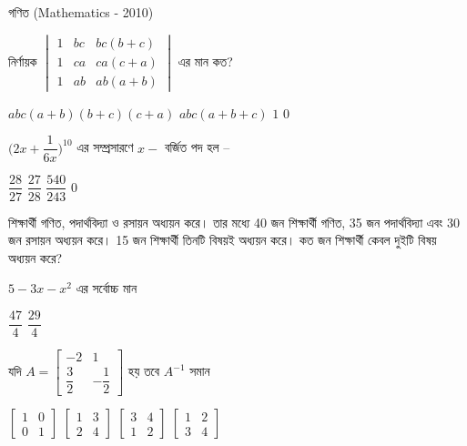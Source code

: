 \documentclass[addpoints]{exam}
\begin{document}
\begin{LARGE}
\begin{center}
গণিত (Mathematics - 2010)
\end{center}
\end{LARGE}
\begin{questions}

 \question নির্ণায়ক $ \begin{vmatrix}
 1 & bc & bc(b+c)\\
 1 & ca & ca(c+a)\\
 1 & ab & ab(a+b)
\end{vmatrix}   $  এর মান কত?

\begin{oneparchoices}
\choice $ abc(a+b)(b+c)(c+a) $
\choice $ abc(a+b+c) $
\choice $ 1 $
\choice $ 0 $
\end{oneparchoices}

\question $ \Bigg(2x + \dfrac{1}{6x} \Bigg)^{10} $ এর সম্প্রসারণে $ x- $ বর্জিত পদ হল – 

\begin{oneparchoices}
\choice $ \dfrac{28}{27} $
\choice $ \dfrac{27}{28} $
\choice $ \dfrac{540}{243} $
\choice  $ 0 $
\end{oneparchoices}

 শিক্ষার্থী গণিত, পদার্থবিদ্যা ও রসায়ন অধ্যয়ন করে। তার মধ্যে 40 জন শিক্ষার্থী গণিত, 35 জন পদার্থবিদ্যা এবং 30 জন রসায়ন অধ্যয়ন করে। 15 জন শিক্ষার্থী তিনটি বিষয়ই অধ্যয়ন করে। কত জন শিক্ষার্থী কেবল দুইটি বিষয় অধ্যয়ন করে?


\begin{oneparchoices}

\end{oneparchoices}

\question $ 5-3x-x^{2} $  এর সর্বোচ্চ মান

\begin{oneparchoices}
\choice $ \dfrac{47}{4} $
\choice $ \dfrac{29}{4} $
\end{oneparchoices}

\question  যদি $ A = \begin{bmatrix}
-2 & 1\\
\dfrac{3}{2} & -\dfrac{1}{2} 
\end{bmatrix} $ হয় তবে $ A^{-1} $ সমান

\begin{oneparchoices}
\choice $\begin{bmatrix}
1 & 0\\
0 & 1 
\end{bmatrix} $
\choice $\begin{bmatrix}
1 & 3\\
2 & 4 
\end{bmatrix} $
\choice $\begin{bmatrix}
3 & 4\\
1 & 2 
\end{bmatrix} $
\choice $\begin{bmatrix}
1 & 2\\
3 & 4 
\end{bmatrix} $
\end{oneparchoices}


\end{questions}
\end{document}
